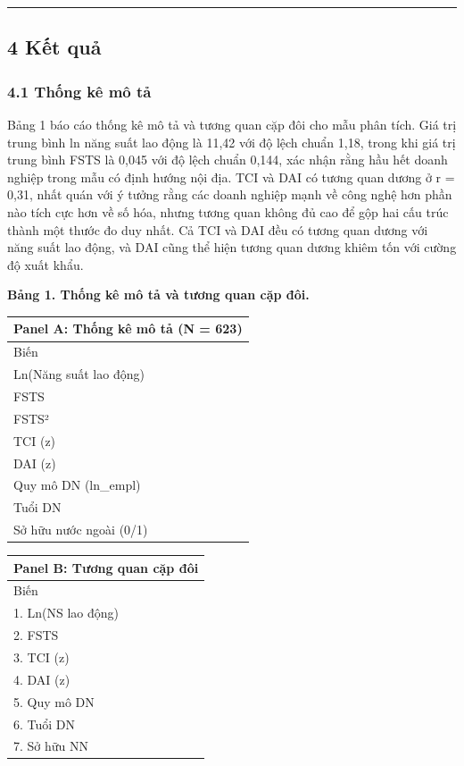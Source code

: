 \documentclass[12pt,a4paper]{article}
\begin{document}
\begin{center}\rule{0.5\linewidth}{0.5pt}\end{center}

\hypertarget{4-kux1ebft-quux1ea3}{%
\subsection{4 Kết quả}\label{4-kux1ebft-quux1ea3}}

\hypertarget{41-thux1ed1ng-kuxea-muxf4-tux1ea3}{%
\subsubsection{4.1 Thống kê mô
tả}\label{41-thux1ed1ng-kuxea-muxf4-tux1ea3}}

Bảng 1 báo cáo thống kê mô tả và tương quan cặp đôi cho mẫu phân tích.
Giá trị trung bình ln năng suất lao động là 11,42 với độ lệch chuẩn
1,18, trong khi giá trị trung bình FSTS là 0,045 với độ lệch chuẩn
0,144, xác nhận rằng hầu hết doanh nghiệp trong mẫu có định hướng nội
địa. TCI và DAI có tương quan dương ở r = 0,31, nhất quán với ý tưởng
rằng các doanh nghiệp mạnh về công nghệ hơn phần nào tích cực hơn về số
hóa, nhưng tương quan không đủ cao để gộp hai cấu trúc thành một thước
đo duy nhất. Cả TCI và DAI đều có tương quan dương với năng suất lao
động, và DAI cũng thể hiện tương quan dương khiêm tốn với cường độ xuất
khẩu.

\textbf{Bảng 1. Thống kê mô tả và tương quan cặp đôi.}

\begin{longtable}[]{@{}l@{}}
\toprule\noalign{}
Panel A: Thống kê mô tả (N = 623) \\
\midrule\noalign{}
\endhead
\bottomrule\noalign{}
\endlastfoot
Biến \\
Ln(Năng suất lao động) \\
FSTS \\
FSTS² \\
TCI (z) \\
DAI (z) \\
Quy mô DN (ln\_empl) \\
Tuổi DN \\
Sở hữu nước ngoài (0/1) \\
\end{longtable}

\begin{longtable}[]{@{}l@{}}
\toprule\noalign{}
Panel B: Tương quan cặp đôi \\
\midrule\noalign{}
\endhead
\bottomrule\noalign{}
\endlastfoot
Biến \\
1. Ln(NS lao động) \\
2. FSTS \\
3. TCI (z) \\
4. DAI (z) \\
5. Quy mô DN \\
6. Tuổi DN \\
7. Sở hữu NN \\
\end{longtable}
\end{document}
